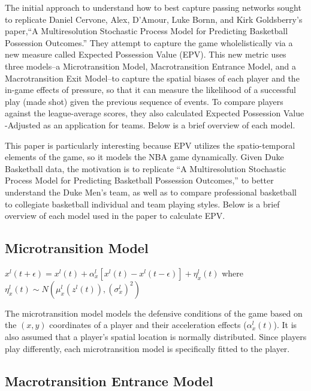 \documentclass[12pt,twoside]{dukestatscithesis}
\theoremstyle{definition}
\theoremstyle{definition}
\theoremstyle{definition}
\theoremstyle{remark}
\begin{document}
The initial approach to understand how to best capture passing networks
sought to replicate Daniel Cervone, Alex, D'Amour, Luke Bornn, and Kirk
Goldsberry's paper,``A Multiresolution Stochastic Process Model for
Predicting Basketball Possession Outcomes.'' They attempt to capture the
game wholelistically via a new measure called Expected Possession Value
(EPV). This new metric uses three models--a Microtransition Model,
Macrotransition Entrance Model, and a Macrotransition Exit Model--to
capture the spatial biases of each player and the in-game effects of
pressure, so that it can measure the likelihood of a successful play
(made shot) given the previous sequence of events. To compare players
against the league-average scores, they also calculated Expected
Possession Value -Adjusted as an application for teams. Below is a brief
overview of each model.

This paper is particularly interesting because EPV utilizes the
spatio-temporal elements of the game, so it models the NBA game
dynamically. Given Duke Basketball data, the motivation is to replicate
``A Multiresolution Stochastic Process Model for Predicting Basketball
Possession Outcomes,'' to better understand the Duke Men's team, as well
as to compare professional basketball to collegiate basketball
individual and team playing styles. Below is a brief overview of each
model used in the paper to calculate EPV.

\subsection{Microtransition Model}\label{microtransition-model}

\(x^{l}(t+\epsilon) = x^{l}(t) + \alpha^{l}_{x}[x^{l}(t) - x^{l}(t-\epsilon)] + \eta^{l}_{x}(t)\)
where
\(\eta^{l}_{x}(t) \sim N(\mu^{l}_{x}(z^{l}(t)), (\sigma^{l}_{x})^{2})\)

The microtransition model models the defensive conditions of the game
based on the \((x,y)\) coordinates of a player and their acceleration
effects (\(\alpha^{l}_{x}(t)\)). It is also assumed that a player's
spatial location is normally distributed. Since players play
differently, each microtransition model is specifically fitted to the
player.

\subsection{Macrotransition Entrance
Model}\label{macrotransition-entrance-model}
\end{document}
